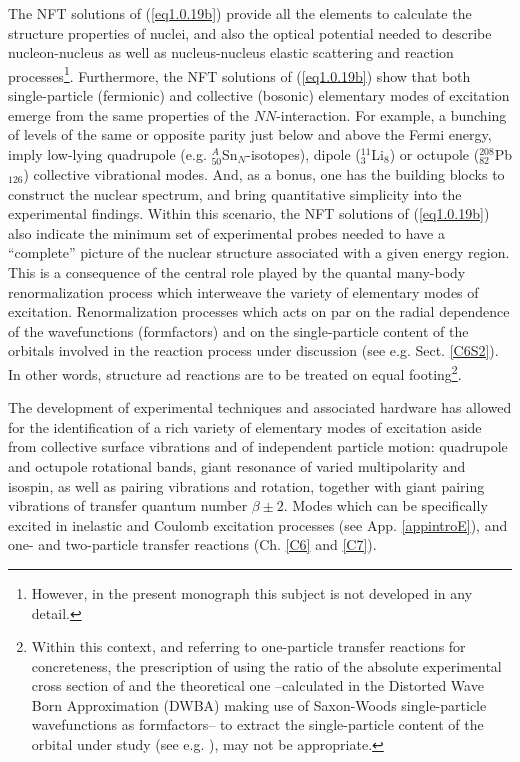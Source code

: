The NFT solutions of (\ref{eq1.0.19b}) provide all the elements to calculate the structure properties of nuclei, and also the optical potential needed to describe nucleon-nucleus as well as nucleus-nucleus elastic scattering and reaction processes\footnote{However, in the present monograph this subject is not developed in any detail.}.
Furthermore, the NFT solutions of (\ref{eq1.0.19b}) show that both single-particle (fermionic) and collective (bosonic) elementary modes of excitation emerge from the same properties of the $NN$-interaction. For example, a bunching of levels of the same or opposite parity just below and above the Fermi energy, imply low-lying quadrupole (e.g. $^A_{50}$Sn$_{N}$-isotopes), dipole ($^{11}_3$Li$_8$) or octupole ($^{208}_{82}$Pb$_{126}$) collective vibrational modes. And, as a bonus, one has the building blocks to construct the nuclear spectrum, and bring quantitative simplicity into the experimental findings. Within this scenario, the NFT solutions of (\ref{eq1.0.19b}) also indicate the minimum set of experimental probes needed to have a ``complete'' picture of the nuclear structure associated with a given energy region. This is a consequence of the central role played by the quantal many-body renormalization process which interweave the variety of elementary modes of excitation.
Renormalization processes which acts on par on the radial dependence of the wavefunctions (formfactors) and on the single-particle content of the orbitals involved in the reaction process under discussion (see e.g. Sect. \ref{C6S2}). In other words, structure ad reactions are to be treated on equal footing\footnote{Within this context, and referring to one-particle transfer reactions for concreteness, the prescription of using the ratio of the absolute experimental cross section of and the theoretical one --calculated in the Distorted Wave Born Approximation (DWBA) making use of Saxon-Woods single-particle wavefunctions as formfactors-- to extract the single-particle content of the orbital under study (see e.g. \cite{Schiffer:12}), may not be appropriate.}. 


The development of experimental techniques and associated hardware has allowed for the identification of a rich variety of elementary modes of excitation aside from collective surface vibrations and of independent particle motion: quadrupole and octupole rotational bands, giant resonance of varied multipolarity and isospin, as well as pairing vibrations and rotation, together with giant pairing vibrations of transfer quantum number $\beta\pm 2$. Modes which can be specifically excited in inelastic and Coulomb excitation processes (see App. \ref{appintroE}), and one- and two-particle transfer reactions (Ch. \ref{C6} and \ref{C7}).
